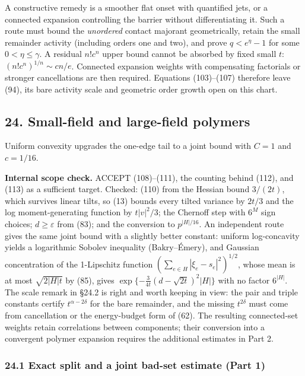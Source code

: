 \documentclass[11pt,a4paper]{article}
\begin{document}
A constructive remedy is a smoother flat onset with quantified jets, or
a connected expansion controlling the barrier without differentiating
it. Such a route must bound the \emph{unordered} contact majorant
geometrically, retain the small remainder activity (including orders one
and two), and prove \(q<e^\eta-1\) for some \(0<\eta\le\gamma\). A
residual \(n!c^n\) upper bound cannot be absorbed by fixed small \(t\):
\((n!c^n)^{1/n}\sim cn/e\). Connected expansion weights with
compensating factorials or stronger cancellations are then required.
Equations (103)--(107) therefore leave (94), its bare activity scale and
geometric order growth open on this chart.

\hypertarget{small-field-and-large-field-polymers}{%
\subsection{24. Small-field and large-field
polymers}\label{small-field-and-large-field-polymers}}

Uniform convexity upgrades the one-edge tail to a joint bound with
\(C=1\) and \(c=1/16\).

\textbf{Internal scope check.} ACCEPT (108)--(111), the counting behind
(112), and (113) as a sufficient target. Checked: (110) from the Hessian
bound \(3/(2t)\), which survives linear tilts, so (13) bounds every
tilted variance by \(2t/3\) and the log moment-generating function by
\(t|v|^2/3\); the Chernoff step with \(6^M\) sign choices;
\(d\ge\varepsilon\) from (83); and the conversion to \(p^{|H|/16}\). An
independent route gives the same joint bound with a slightly better
constant: uniform log-concavity yields a logarithmic Sobolev inequality
(Bakry--Émery), and Gaussian concentration of the 1-Lipschitz function
\((\sum_{e\in H}|\xi_e-s_e|^2)^{1/2}\), whose mean is at most
\(\sqrt{2|H|t}\) by (85), gives
\(\exp\{-\frac3{4t}(d-\sqrt{2t})^2|H|\}\) with no factor \(6^{|H|}\).
The scale remark in §24.2 is right and worth keeping in view: the pair
and triple constants certify \(t^{\alpha-2\delta}\) for the bare
remainder, and the missing \(t^{2\delta}\) must come from cancellation
or the energy-budget form of (62). The resulting connected-set weights
retain correlations between components; their conversion into a
convergent polymer expansion requires the additional estimates in Part
2.

\hypertarget{exact-split-and-a-joint-bad-set-estimate-part-1}{%
\subsubsection{24.1 Exact split and a joint bad-set estimate (Part
1)}\label{exact-split-and-a-joint-bad-set-estimate-part-1}}
\end{document}
